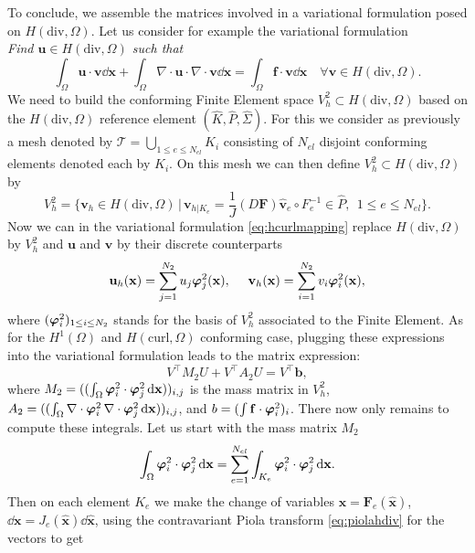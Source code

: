 To conclude, we assemble the matrices involved in a variational formulation posed on $ H(\textrm{div}, \Omega)$. Let us consider for example the variational formulation\\
\textit{ Find $\mathbf{u}\in H(\textrm{div}, \Omega)$ such that}
\begin{equation}\label{eq:hdivmapping}
\int_\Omega \mathbf{u}\cdot \mathbf{v}\dd \mathbf{x} + \int_\Omega \nabla\cdot\mathbf{u}\cdot \nabla\cdot\mathbf{v}\dd \mathbf{x} = \int_\Omega \mathbf{f}\cdot \mathbf{v}\dd \mathbf{x} \quad\forall \mathbf{v}\in H(\textrm{div}, \Omega).
\end{equation}
We need to build the conforming Finite Element space $V^2_h\subset H(\textrm{div}, \Omega)$ based on the $ H(\textrm{div}, \Omega)$  reference element $(\hat{K},\hat{P},\hat{\Sigma})$. For this we consider as previously a mesh denoted by $\mathcal{T}=\bigcup_{1\leq e \leq N_{el}} K_i$ 
consisting of $N_{el}$ disjoint conforming elements denoted each by $K_i$.
On this mesh we can then define $V^2_h \subset H(\textrm{div}, \Omega)$ by
$$V^2_h = \{ \mathbf{v}_h\in H(\textrm{div}, \Omega) \,|\, \mathbf{v}_{h|K_e}= \frac{1}{J}(D \mathbf{F})\hat{\mathbf{v}}_e \circ F_e^{-1} \in \hat{P}, ~~ 1\leq e\leq N_{el}  \}.$$
Now we can in the variational formulation \eqref{eq:hcurlmapping} replace  $ H(\textrm{div}, \Omega)$ by $V^2_h$ and $ \mathbf{u}$ and $\mathbf{v}$ by their discrete counterparts 
$$ \mathbf{u}_h ( \mathbf{x})= \sum_{j=1}^{N_2} u_j \boldsymbol{\varphi}^2_j ( \mathbf{x}), ~~~~
 \mathbf{v}_h ( \mathbf{x})= \sum_{i=1}^{N_2} v_i \boldsymbol{\varphi}^2_i ( \mathbf{x}),$$
where $ ( \boldsymbol{\varphi}^2_i)_{1\leq i \leq N_2}$ stands for the basis of $V^2_h$ associated to the Finite Element. As for the $ H^1(\Omega)$ and $ H(\textrm{curl}, \Omega)$ conforming case, plugging these expressions into the variational formulation leads to the matrix expression:
$$V^\top M_2 U + V^\top A_2 U = V^\top \mathbf{b},$$
where $M_2= ((\int_\Omega \boldsymbol{\varphi}^2_i\cdot \boldsymbol{\varphi}^2_j \,{\rm d} \mathbf{x}))_{i,j}$ is the mass matrix in $V^2_h$,
$A_2 =  ((\int_\Omega \nabla\cdot\boldsymbol{\varphi}^2_i\, \nabla\cdot\boldsymbol{\varphi}^2_j \,{\rm d} \mathbf{x}))_{i,j}$, and 
$b= (\int \mathbf{f}\cdot \boldsymbol{\varphi}^2_i)_i$. There now only remains to compute these integrals. Let us start with the mass matrix  $M_2$
$$ \int_\Omega \boldsymbol{\varphi}^2_i\cdot \boldsymbol{\varphi}^2_j \,{\rm d} \mathbf{x} = \sum_{e=1}^{N_{el}}
 \int_{K_e} \boldsymbol{\varphi}^2_i\cdot \boldsymbol{\varphi}^2_j \,{\rm d} \mathbf{x}.$$
 Then on each element $K_e$ we make the change of variables $ \mathbf{x}= \mathbf{F}_e(\hat{\mathbf{x}})$, 
 $ \dd\mathbf{x}= J_e( \hat{\mathbf{x}})\dd \hat{\mathbf{x}}$, using the contravariant Piola transform \eqref{eq:piolahdiv} for the vectors  to get
